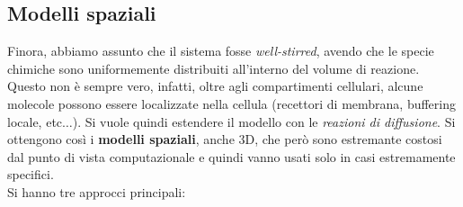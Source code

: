 \documentclass[a4paper,12pt, oneside]{book}
\begin{document}
\subsection{Modelli spaziali}
Finora, abbiamo assunto che il sistema fosse \textit{well-stirred}, avendo che le
specie chimiche sono uniformemente distribuiti all'interno del volume di
reazione. Questo non è sempre vero, infatti, oltre agli compartimenti cellulari,
alcune molecole possono essere localizzate nella cellula (recettori
di membrana, buffering locale, etc$\ldots$). Si vuole quindi estendere il
modello con le \textit{reazioni di diffusione}. Si ottengono così i
\textbf{modelli spaziali}, anche 3D, che però sono estremante costosi dal punto
di vista 
computazionale e quindi vanno usati solo in casi estremamente specifici.\\
Si hanno tre approcci principali:
\end{document}
